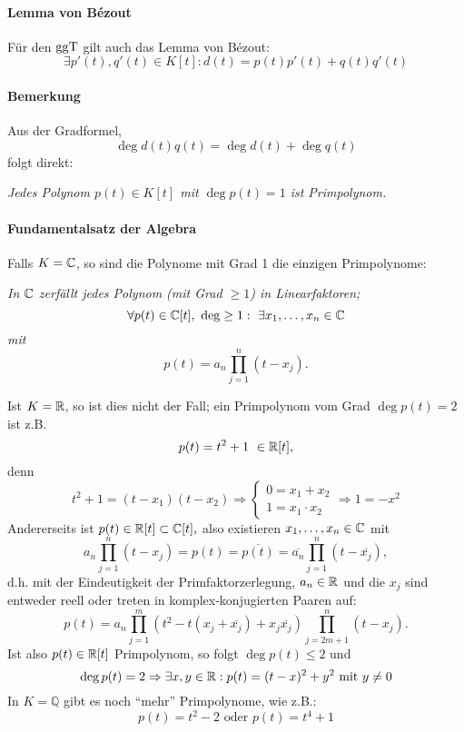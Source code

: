\paragraph{Lemma von B\'ezout}
	\label{Bezout}
	\begin{Lemma}
	Für den $ \operatorname{ggT} $ gilt auch das Lemma von B\'ezout:
		\[ \exists p'(t),q'(t)\in K[t]: d(t)=p(t)p'(t)+q(t)q'(t) \]
	\end{Lemma}
\paragraph{Bemerkung}
	Aus der Gradformel,
		\[ \deg d(t)q(t) = \deg d(t)+\deg q(t) \]
	folgt direkt:
		\begin{addmargin}{1cm}
			\textit{Jedes Polynom $ p(t)\in K[t] $ mit $ \deg p(t)=1 $ ist Primpolynom.}
		\end{addmargin}

\paragraph{Fundamentalsatz der Algebra}
	Falls $ K = \mathbb{C} $, so sind die Polynome mit Grad 1 die einzigen Primpolynome:
		\begin{Satz}
		\begin{addmargin}{1cm}
			\textit{In $ \mathbb{C} $ zerfällt jedes Polynom (mit Grad $ \geq 1 $) in Linearfaktoren;
				\[ \forall p(t)\in \C[t],\ \deg \geq 1:\ \exists x_1,\dots,x_n \in \C \]
			mit
				\[ p(t) = a_n \prod_{j=1}^{n}(t-x_j). \]}
		\end{addmargin}
		\end{Satz}
	Ist $ K=\mathbb{R} $, so ist dies nicht der Fall; ein Primpolynom vom Grad $ \deg p(t) = 2 $ ist z.B.
		\[ p(t) = t^2+1\ \in \mathbb{R}[t], \]
	denn
		\[ t^2+1 = (t-x_1)(t-x_2) \Rightarrow
			\begin{cases}
				0 = x_1 + x_2\\
				1 = x_1 \cdot x_2
			\end{cases}
		\Rightarrow 1 = -x^2 \]
	Andererseits ist $ p(t)\in \mathbb{R}[t]\subset \mathbb{C}[t], $
	also existieren $ x_1,\dots,x_n\in \mathbb{C} $ mit
		\[ a_n\prod_{j=1}^{n}(t-x_j) = p(t) = \overline{p(t)} = \overline{a_n}\prod_{j=1}^{n}(t-\overline{x_j}), \]
	d.h. mit der Eindeutigkeit der Primfaktorzerlegung, $ a_n\in \mathbb{R} $ und die $ x_j $ sind entweder reell oder treten in komplex-konjugierten Paaren auf:
		\[ p(t) = a_n\prod_{j=1}^{m}(t^2-t(x_j+\overline{x_j})+x_j\overline{x_j})\prod_{j=2m+1}^{n}(t-x_j). \]
	Ist also $ p(t) \in \mathbb{R}[t] $ Primpolynom, so folgt $ \deg p(t)\leq 2 $ und
		\[ \deg p(t) = 2 \Rightarrow \exists x,y\in \mathbb{R}: p(t) = (t-x)^2+y^2 \text{ mit } y\neq 0\]
	In $ K=\mathbb{Q} $ gibt es noch "`mehr"' Primpolynome, wie z.B.:
		\[ p(t) = t^2-2 \text{ oder } p(t) = t^4+1 \]
